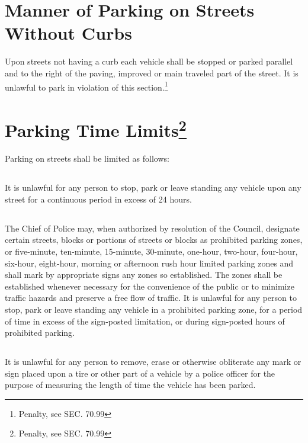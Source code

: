 \section{Manner of Parking on Streets Without Curbs}
Upon streets not having a curb each vehicle shall be stopped or parked parallel and to the right of the paving, improved or main traveled part of the street.  It is unlawful to park in violation of this section.\footnote{Penalty, see SEC. 70.99}

\section{Parking Time Limits\footnote{Penalty, see SEC. 70.99}}
Parking on streets shall be limited as follows:
\subsection{}
It is unlawful for any person to stop, park or leave standing any vehicle upon any street for a continuous period in excess of 24 hours.
\subsection{}
The Chief of Police may, when authorized by resolution of the Council, designate certain streets, blocks or portions of streets or blocks as prohibited parking zones, or five-minute, ten-minute, 15-minute, 30-minute, one-hour, two-hour, four-hour, six-hour, eight-hour, morning or afternoon rush hour limited parking zones and shall mark by appropriate signs any zones so established.  The zones shall be established whenever necessary for the convenience of the public or to minimize traffic hazards and preserve a free flow of traffic.  It is unlawful for any person to stop, park or leave standing any vehicle in a prohibited parking zone, for a period of time in excess of the sign-posted limitation, or during sign-posted hours of prohibited parking.
\subsection{}
It is unlawful for any person to remove, erase or otherwise obliterate any mark or sign placed upon a tire or other part of a vehicle by a police officer for the purpose of measuring the length of time the vehicle has been parked.
